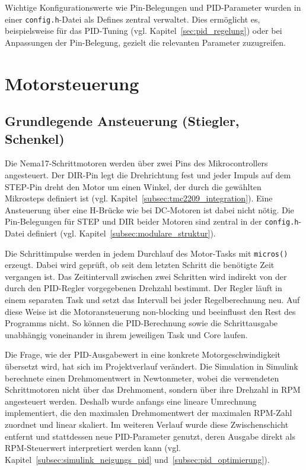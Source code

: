 \documentclass[fontsize=12pt,
parskip=half,	%
department=FakM,  %
logostyle=flat,
twoside, %
DIV=15,BCOR=10mm, %
]{OTHRreprt}
\begin{document}
Wichtige Konfigurationswerte wie Pin-Belegungen und PID-Parameter wurden in einer \texttt{config.h}-Datei als Defines zentral verwaltet. Dies ermöglicht es, beispielsweise für das PID-Tuning (vgl. Kapitel~\ref{sec:pid_regelung}) oder bei Anpassungen der Pin-Belegung, gezielt die relevanten Parameter zuzugreifen.

\section{Motorsteuerung}
\label{sec:motorsteuerung}

\subsection{Grundlegende Ansteuerung (Stiegler, Schenkel)}
\label{subsec:motor_grundansteuerung}

Die Nema17-Schrittmotoren werden über zwei Pins des Mikrocontrollers angesteuert. Der DIR-Pin legt die Drehrichtung fest und jeder Impuls auf dem STEP-Pin dreht den Motor um einen Winkel, der durch die gewählten Mikrosteps definiert ist (vgl. Kapitel~\ref{subsec:tmc2209_integration}). Eine Ansteuerung über eine H-Brücke wie bei DC-Motoren ist dabei nicht nötig. Die Pin-Belegungen für STEP und DIR beider Motoren sind zentral in der \texttt{config.h}-Datei definiert (vgl. Kapitel~\ref{subsec:modulare_struktur}).

Die Schrittimpulse werden in jedem Durchlauf des Motor-Tasks mit \texttt{micros()} erzeugt. Dabei wird geprüft, ob seit dem letzten Schritt die benötigte Zeit vergangen ist. Das Zeitintervall zwischen zwei Schritten wird indirekt von der durch den PID-Regler vorgegebenen Drehzahl bestimmt. Der Regler läuft in einem separaten Task und setzt das Intervall bei jeder Regelberechnung neu. Auf diese Weise ist die Motoransteuerung non-blocking und beeinflusst den Rest des Programms nicht. So können die PID-Berechnung sowie die Schrittausgabe unabhängig voneinander in ihrem jeweiligen Task und Core laufen.

Die Frage, wie der PID-Ausgabewert in eine konkrete Motorgeschwindigkeit übersetzt wird, hat sich im Projektverlauf verändert. Die Simulation in Simulink berechnete einen Drehmomentwert in Newtonmeter, wobei die verwendeten Schrittmotoren nicht über das Drehmoment, sondern über ihre Drehzahl in RPM angesteuert werden. Deshalb wurde anfangs eine lineare Umrechnung implementiert, die den maximalen Drehmomentwert der maximalen RPM-Zahl zuordnet und linear skaliert. Im weiteren Verlauf wurde diese Zwischenschicht entfernt und stattdessen neue PID-Parameter genutzt, deren Ausgabe direkt als RPM-Steuerwert interpretiert werden kann (vgl. Kapitel~\ref{subsec:simulink_neigungs_pid} und~\ref{subsec:pid_optimierung}).
\end{document}
